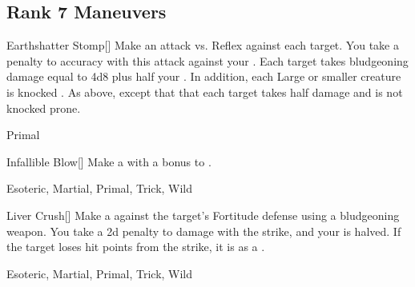 \subsection{Rank 7 Maneuvers}

\lowercase{\hypertarget{maneuver:Earthshatter Stomp}{}}\label{maneuver:Earthshatter Stomp}
\hypertarget{maneuver:Earthshatter Stomp}{}
\begin{freeability}[Rank 7]{Earthshatter Stomp}[]
Make an attack vs. Reflex against each target.
You take a  penalty to accuracy with this attack against your .
\hit Each target takes bludgeoning damage equal to 4d8 plus half your .
In addition, each Large or smaller creature is knocked .
\glance As above, except that that each target takes half damage and is not knocked prone.


 Primal
\end{freeability}
\vspace{0.25em}



\lowercase{\hypertarget{maneuver:Infallible Blow}{}}\label{maneuver:Infallible Blow}
\hypertarget{maneuver:Infallible Blow}{}
\begin{freeability}[Rank 7]{Infallible Blow}[]
Make a  with a  bonus to .


 Esoteric, Martial, Primal, Trick, Wild
\end{freeability}
\vspace{0.25em}



\lowercase{\hypertarget{maneuver:Liver Crush}{}}\label{maneuver:Liver Crush}
\hypertarget{maneuver:Liver Crush}{}
\begin{freeability}[Rank 7]{Liver Crush}[]
Make a  against the target's Fortitude defense using a bludgeoning weapon.
You take a \minus2d penalty to damage with the strike, and your  is halved.
If the target loses hit points from the strike, it is  as a .


 Esoteric, Martial, Primal, Trick, Wild
\end{freeability}
\vspace{0.25em}



